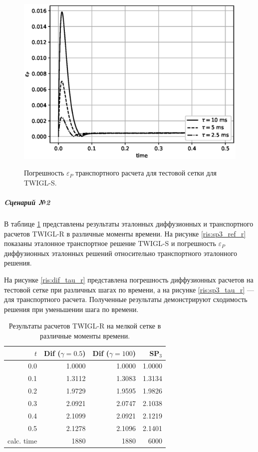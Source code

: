 \documentclass{crm-article}
\begin{document}
\begin{figure}[ht]
\begin{center}
	\includegraphics[width=0.4\linewidth]{sp3_tau_s.eps}\\
	\caption{\label{image:canonsummary} Погрешность $\varepsilon_P$ транспортного расчета для тестовой сетки для TWIGL-S.}
	\label{ris:sp3_tau_s}
\end{center}
\end{figure}

\subparagraph{Cценарий №2}
В таблице \ref{table:twigl-r} представлены результаты эталонных диффузионных и транспортного расчетов TWIGL-R в различные моменты времени.
На рисунке \ref{ris:sp3_ref_r} показаны эталонное транспортное решение TWIGL-S и погрешность $\varepsilon_P$ диффузионных эталонных решений относительно транспортного эталонного решения. 

На рисунке \ref{ris:dif_tau_r} представлена погрешность диффузионных расчетов на тестовой сетке при различных шагах по времени, а на рисунке \ref{ris:sp3_tau_r} --- для транспортного расчета. Полученные результаты демонстрируют сходимость решения при уменьшении шага по времени.


\begin{table}[ht]
\caption{Результаты расчетов TWIGL-R на мелкой сетке в различные моменты времени.}
\label{table:twigl-r}
\begin{center}
\begin{tabular}{r r r r}
\hline
$t$ & Dif ($\gamma=0.5$) & Dif ($\gamma=100$) & SP$_3$\\
\hline
0.0 & 1.0000 & 1.0000 & 1.0000 \\
0.1 & 1.3112 & 1.3083 & 1.3134 \\
0.2 & 1.9729 & 1.9595 & 1.9826 \\
0.3 & 2.0921 & 2.0747 & 2.1038 \\
0.4 & 2.1099 & 2.0921 & 2.1219 \\
0.5 & 2.1278 & 2.1096 & 2.1401 \\
\hline
calc. time & 1880 & 1880 & 6000 \\
\end{tabular}
\end{center}
\end{table}
\end{document}

